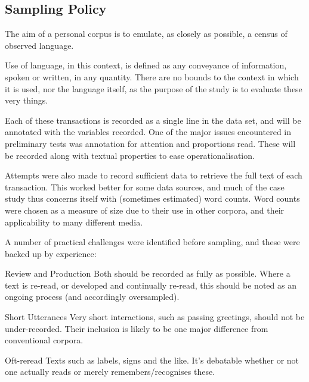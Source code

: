\subsection{Sampling Policy}
\label{sec:personal:samplingpolicy}
The aim of a personal corpus is to emulate, as closely as possible, a census of observed language.

Use of language, in this context, is defined as any conveyance of information, spoken or written, in any quantity. There are no bounds to the context in which it is used, nor the language itself, as the purpose of the study is to evaluate these very things.

Each of these transactions is recorded as a single line in the data set, and will be annotated with the variables recorded.  One of the major issues encountered in preliminary tests was annotation for attention and proportions read.  These will be recorded along with textual properties to ease operationalisation.

Attempts were also made to record sufficient data to retrieve the full text of each transaction.  This worked better for some data sources, and much of the case study thus concerns itself with (sometimes estimated) word counts.  Word counts were chosen as a measure of size due to their use in other corpora, and their applicability to many different media.


A number of practical challenges were identified before sampling, and these were backed up by experience:
\begin{itemizeTitle}
    \item[Review and Production] Both should be recorded as fully as possible. Where a text is re-read, or developed and continually re-read, this should be noted as an ongoing process (and accordingly oversampled).
    \item[Short Utterances] Very short interactions, such as passing greetings, should not be under-recorded. Their inclusion is likely to be one major difference from conventional corpora.
    \item[Oft-reread Texts] such as labels, signs and the like. It’s debatable whether or not one actually reads or merely remembers/recognises these.  
            
\end{itemizeTitle}
